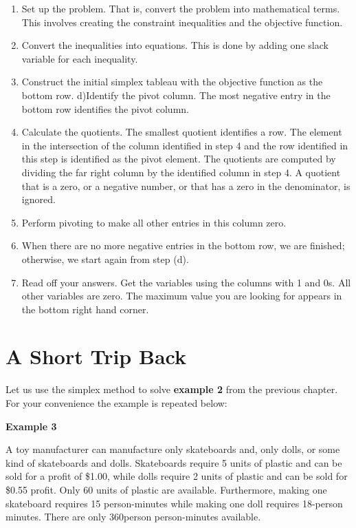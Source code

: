 \documentclass[
  letterpaper,
  DIV=11,
  numbers=noendperiod]{scrreprt}
\providecommand{\tightlist}{%
  \setlength{\itemsep}{0pt}\setlength{\parskip}{0pt}}\usepackage{longtable,booktabs,array}
\begin{document}
\begin{enumerate}
\def\labelenumi{\alph{enumi})}
\tightlist
\item
  Set up the problem. That is, convert the problem into mathematical
  terms. This involves creating the constraint inequalities and the
  objective function.
\item
  Convert the inequalities into equations. This is done by adding one
  slack variable for each inequality.
\item
  Construct the initial simplex tableau with the objective function as
  the bottom row. d)Identify the pivot column. The most negative entry
  in the bottom row identifies the pivot column.
\item
  Calculate the quotients. The smallest quotient identifies a row. The
  element in the intersection of the column identified in step 4 and the
  row identified in this step is identified as the pivot element. The
  quotients are computed by dividing the far right column by the
  identified column in step 4. A quotient that is a zero, or a negative
  number, or that has a zero in the denominator, is ignored.
\item
  Perform pivoting to make all other entries in this column zero.
\item
  When there are no more negative entries in the bottom row, we are
  finished; otherwise, we start again from step (d).
\item
  Read off your answers. Get the variables using the columns with 1 and
  0s. All other variables are zero. The maximum value you are looking
  for appears in the bottom right hand corner.
\end{enumerate}

\hypertarget{a-short-trip-back}{%
\section{A Short Trip Back}\label{a-short-trip-back}}

Let us use the simplex method to solve \textbf{example 2} from the
previous chapter. For your convenience the example is repeated below:

\textbf{Example 3}

A toy manufacturer can manufacture only skateboards and, only dolls, or
some kind of skateboards and dolls. Skateboards require 5 units of
plastic and can be sold for a profit of \$1.00, while dolls require 2
units of plastic and can be sold for \$0.55 profit. Only 60 units of
plastic are available. Furthermore, making one skateboard requires 15
person-minutes while making one doll requires 18-person minutes. There
are only 360person person-minutes available.
\end{document}
